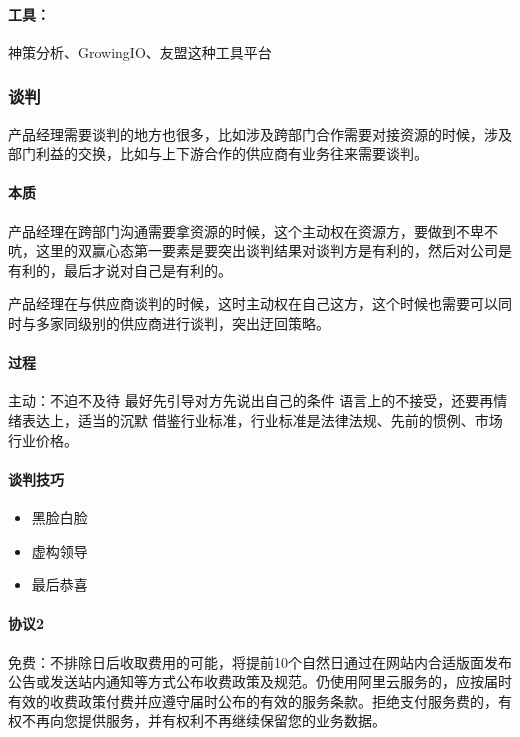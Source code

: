\documentclass[letterpaper,11pt,english]{sphinxmanual}
\begin{document}
\paragraph{工具：}
\label{\detokenize{chapter_idea/data:id9}}
神策分析、GrowingIO、友盟这种工具平台


\subsubsection{谈判}
\label{\detokenize{chapter_idea/negotiation:id1}}\label{\detokenize{chapter_idea/negotiation::doc}}
产品经理需要谈判的地方也很多，比如涉及跨部门合作需要对接资源的时候，涉及部门利益的交换，比如与上下游合作的供应商有业务往来需要谈判。


\paragraph{本质}
\label{\detokenize{chapter_idea/negotiation:id2}}
产品经理在跨部门沟通需要拿资源的时候，这个主动权在资源方，要做到不卑不吭，这里的双赢心态第一要素是要突出谈判结果对谈判方是有利的，然后对公司是有利的，最后才说对自己是有利的。

产品经理在与供应商谈判的时候，这时主动权在自己这方，这个时候也需要可以同时与多家同级别的供应商进行谈判，突出迂回策略。


\paragraph{过程}
\label{\detokenize{chapter_idea/negotiation:id3}}
主动：不迫不及待 最好先引导对方先说出自己的条件
语言上的不接受，还要再情绪表达上，适当的沉默
借鉴行业标准，行业标准是法律法规、先前的惯例、市场行业价格。


\paragraph{谈判技巧}
\label{\detokenize{chapter_idea/negotiation:id4}}\begin{itemize}
\item {} 
黑脸白脸

\item {} 
虚构领导

\item {} 
最后恭喜

\end{itemize}


\paragraph{协议2\sphinxfootnotemark[114]}
\label{\detokenize{chapter_idea/negotiation:id5}}%
\begin{footnotetext}[114]\sphinxAtStartFootnote
{}
%
\end{footnotetext}\ignorespaces 
免费：不排除日后收取费用的可能，将提前10个自然日通过在网站内合适版面发布公告或发送站内通知等方式公布收费政策及规范。仍使用阿里云服务的，应按届时有效的收费政策付费并应遵守届时公布的有效的服务条款。拒绝支付服务费的，有权不再向您提供服务，并有权利不再继续保留您的业务数据。
\end{document}
